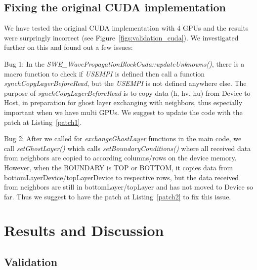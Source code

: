 \documentclass[article]{scrartcl}
\begin{document}
\subsection{Fixing the original CUDA implementation}
\label{fixing_bugs}
We have tested the original CUDA implementation with 4 GPUs and the results were surpringly incorrect (see Figure~\ref{figs:validation_cuda}). We investigated further on this and found out a few issues:


Bug 1: In the \textit{SWE\_WavePropagationBlockCuda::updateUnknowns()}, there is a macro function to check if \textit{USEMPI} is defined then call a function \textit{synchCopyLayerBeforeRead}, but the \textit{USEMPI} is not defined anywhere else. The purpose of \textit{synchCopyLayerBeforeRead} is to copy data (h, hv, hu) from Device to Host, in preparation for ghost layer exchanging with neighbors, thus especially important when we have multi GPUs. We suggest to update the code with the patch at Listing~\ref{patch1}.



Bug 2: After we called for \textit{exchangeGhostLayer} functions in the main code, we call \textit{setGhostLayer()} which calls \textit{setBoundaryConditions()} where all received data from neighbors are copied to according columns/rows on the device memory. However, when the BOUNDARY is TOP or BOTTOM, it copies data from bottomLayerDevice/topLayerDevice to respective rows, but the data received from neighbors are still in bottomLayer/topLayer and has not moved to Device so far. Thus we suggest to have the patch at Listing~\ref{patch2} to fix this issue.



\section{Results and Discussion}
\subsection{Validation}
\end{document}
